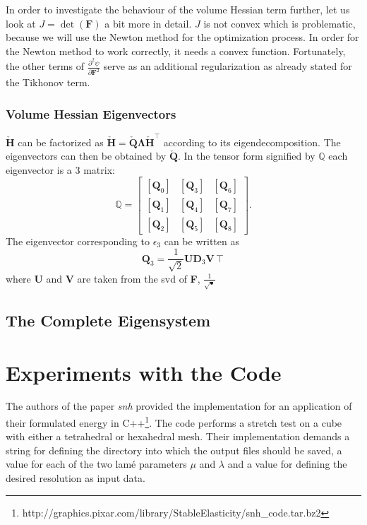 In order to investigate the behaviour of the volume Hessian term further, let us look at $J = \operatorname{det}(\mathbf{F})$ a bit more in detail. $J$ is not convex which is problematic, because we will use the Newton method for the optimization process. In order for the Newton method to work correctly, it needs a convex function. Fortunately, the other terms of $\frac{\partial^2 \psi}{\partial \mathbf{F}^2}$ serve as an additional regularization as already stated for the Tikhonov term.


\subsubsection{Volume Hessian Eigenvectors}
$\mathbf{\check{H}}$ can be factorized as $\mathbf{\check{H}} = \mathbf{\check{Q}}\mathbf{\Lambda}\mathbf{\check{H}}^\intercal$ according to its eigendecomposition. The eigenvectors can then be obtained by $\mathbf{\check{Q}}$. In the tensor form signified by $\mathbb{Q}$ each eigenvector is a 3  matrix:
\[
\mathbb{Q} = \left[\begin{array}{ccc}{\left[\mathbf{Q}_0\right]} & {\left[\mathbf{Q}_3\right]} & {\left[\mathbf{Q}_6\right]} \\ {\left[\mathbf{Q}_1\right]} & {\left[\mathbf{Q}_4\right]} & {\left[\mathbf{Q}_7\right]} \\ {\left[\mathbf{Q}_2\right]} & {\left[\mathbf{Q}_5\right]} & {\left[\mathbf{Q}_8\right]} \end{array}\right].
\]
The eigenvector corresponding to $\epsilon_3$ can be written as
\[
\mathbf{Q}_3 = \frac{1}{\sqrt{2}} \mathbf{U} \mathbf{D}_3 \mathbf{V}\intercal
\]
where \textbf{U} and \textbf{V} are taken from the \acrshort{svd} of \textbf{F}, $\frac{1}{\sqrt{•}}$


\subsection{The Complete Eigensystem}



\section{Experiments with the Code}
The authors of the paper \textit{\acrshort{snh}} provided the implementation for an application of their formulated energy in C++\footnote{http://graphics.pixar.com/library/StableElasticity/snh\_code.tar.bz2}. The code performs a stretch test on a cube with either a tetrahedral or hexahedral mesh. Their implementation demands a string for defining the directory into which the output files should be saved, a value for each of the two lamé parameters $\mu$ and $\lambda$ and a value for defining the desired resolution as input data.

